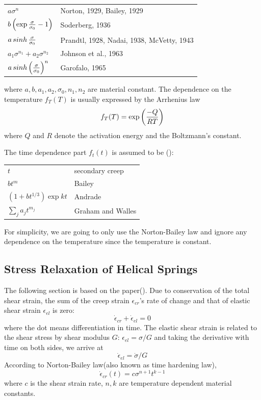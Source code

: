 \documentclass[10pt]{article}
\begin{document}
\begin{tabular}{ll}
$a\sigma^n$ & Norton, 1929, Bailey, 1929 \\
$b\left( \exp{\sigma\over \sigma_0} -1 \right)$ & Soderberg, 1936 \\
$a\mathop{sinh}{\sigma\over \sigma_0}$ & Prandtl, 1928, Nadai, 1938, McVetty, 1943\\
$a_1\sigma^{n_1} + a_2 \sigma^{n_2}$ & Johnson et al., 1963 \\
$a\mathop{sinh} \left( {\sigma\over \sigma_0}\right)^n$ & Garofalo, 1965
\end{tabular}

where $a,b,a_1,a_2,\sigma_0,n_1,n_2$ are material constant. The dependence on the temperature $f_T(T)$ is usually expressed by the Arrhenius law
\[
f_T(T) = \exp \left( {-Q\over RT}\right)
\]
where $Q$ and $R$ denote the activation energy and the Boltzmann's constant.

The time dependence part $f_t(t)$ is assumed to be (\cite{Ch2000}):

\begin{tabular}{ll}
$t$ & secondary creep \\
$bt^m$ & Bailey \\
$(1+bt^{1/3})\exp{kt}$ & Andrade\\
$\sum_j a_j t^{m_j}$ & Graham and Walles
\end{tabular}

For simplicity, we are going to only use the Norton-Bailey law and ignore any dependence on the temperature since the temperature is constant.

\subsection{Stress Relaxation of Helical Springs}

The following section is based on the paper(\cite{Relaxation1}). Due to conservation of the total shear strain, the sum of the creep strain $\epsilon_{cr}$'s rate of change and that of elastic shear strain $\epsilon_{el}$ is zero:
\[
\dot{\epsilon}_{cr} + \dot{\epsilon}_{el} = 0
\]
where the dot means differentiation in time. The elastic shear strain is related to the shear stress by shear modulus $G$: $\epsilon_{el} = \sigma/G$ and taking the derivative with time on both sides, we arrive at
\[
\dot{\epsilon}_{el} = \dot{\sigma}/G
\]
According to Norton-Bailey law(also known as time hardening law),
\begin{equation} \label{eq:N-B}
\dot{\epsilon}_{cr}(t)=c\sigma^{n+1} t^{k-1}
\end{equation}
where $c$ is the shear strain rate, $n,k$ are temperature dependent material constants.
\end{document}
